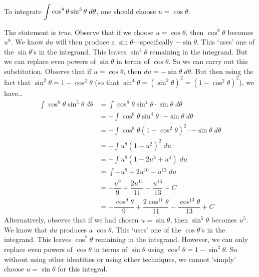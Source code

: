 \documentclass[11pt,letterpaper]{article}
\begin{document}
 To integrate $\displaystyle\int \cos^8 \theta \sin^5 \theta \;d\theta$, one should choose $u= \cos \theta$. \pspace

\sol The statement is \textit{true}. Observe that if we choose $u= \cos \theta$, then $\cos^8 \theta$ becomes $u^8$. We know $du$ will then produce a $\sin \theta$---specifically $-\sin \theta$. This `uses' one of the $\sin \theta$'s in the integrand. This leaves $\sin^4 \theta$ remaining in the integrand. But we can replace even powers of $\sin \theta$ in terms of $\cos \theta$. So we can carry out this substitution. Observe that if $u= \cos \theta$, then $du= -\sin \theta \;d\theta$. But then using the fact that $\sin^2 \theta= 1 - \cos^2 \theta$ (so that $\sin^4 \theta= (\sin^2 \theta)^2= (1 - \cos^2 \theta)^2$), we have\dots
	\[
	\begin{aligned}
	\int \cos^8 \theta \sin^5 \theta \;d\theta&= \int \cos^8 \theta \sin^4 \theta \cdot \sin \theta \; d\theta \\
	&= -\int \cos^8 \theta \sin^4 \theta \cdot -\sin \theta \; d\theta \\
	&= -\int \cos^8 \theta (1 - \cos^2 \theta)^2 \cdot -\sin \theta \;d\theta \\
	&= -\int u^8 (1 - u^2)^2 \;du \\
	&= -\int u^8 (1 - 2u^2 + u^4) \;du \\
	&= \int -u^8 + 2u^{10} - u^{12} \;du \\
	&= -\dfrac{u^9}{9} + \dfrac{2u^{11}}{11} - \dfrac{u^{13}}{13} + C \\
	&= -\dfrac{\cos^9 \theta}{9} + \dfrac{2\cos^{11} \theta}{11} - \dfrac{\cos^{13} \theta}{13} + C
	\end{aligned}
	\]
Alternatively, observe that if we had chosen $u= \sin \theta$, then $\sin^5 \theta$ becomes $u^5$. We know that $du$ produces a $\cos \theta$. This `uses' one of the $\cos \theta$'s in the integrand. This leaves $\cos^7 \theta$ remaining in the integrand. However, we can only replace even powers of $\cos \theta$ in terms of $\sin \theta$ using $\cos^2 \theta= 1 - \sin^2 \theta$. So without using other identities or using other techniques, we cannot `simply' choose $u= \sin \theta$ for this integral. \pvspace{1.3cm}
\end{document}
